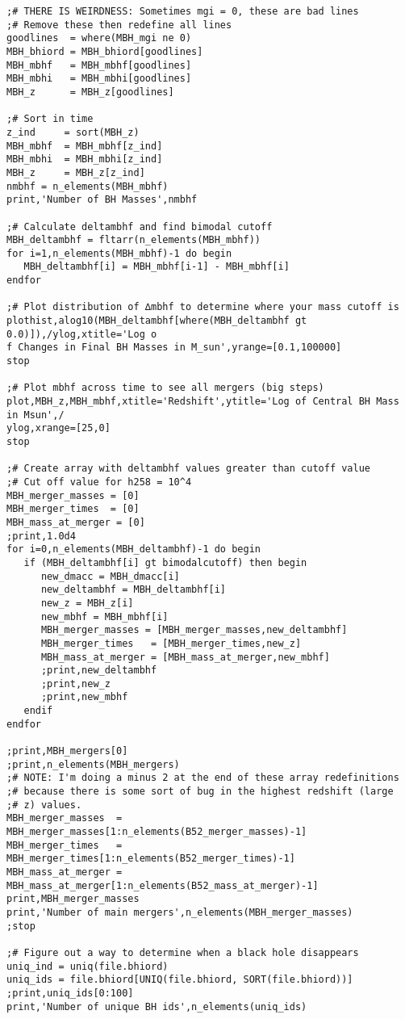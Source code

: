 \documentclass[12pt,headA,chapB]{fiskthesis}
\begin{document}
\begin{verbatim}
;# THERE IS WEIRDNESS: Sometimes mgi = 0, these are bad lines
;# Remove these then redefine all lines
goodlines  = where(MBH_mgi ne 0)
MBH_bhiord = MBH_bhiord[goodlines]
MBH_mbhf   = MBH_mbhf[goodlines]
MBH_mbhi   = MBH_mbhi[goodlines]
MBH_z      = MBH_z[goodlines]

;# Sort in time
z_ind     = sort(MBH_z)
MBH_mbhf  = MBH_mbhf[z_ind]
MBH_mbhi  = MBH_mbhi[z_ind]
MBH_z     = MBH_z[z_ind]
nmbhf = n_elements(MBH_mbhf)
print,'Number of BH Masses',nmbhf

;# Calculate deltambhf and find bimodal cutoff
MBH_deltambhf = fltarr(n_elements(MBH_mbhf))
for i=1,n_elements(MBH_mbhf)-1 do begin
   MBH_deltambhf[i] = MBH_mbhf[i-1] - MBH_mbhf[i]
endfor

;# Plot distribution of ∆mbhf to determine where your mass cutoff is
plothist,alog10(MBH_deltambhf[where(MBH_deltambhf gt 0.0)]),/ylog,xtitle='Log o
f Changes in Final BH Masses in M_sun',yrange=[0.1,100000]
stop

;# Plot mbhf across time to see all mergers (big steps)
plot,MBH_z,MBH_mbhf,xtitle='Redshift',ytitle='Log of Central BH Mass in Msun',/
ylog,xrange=[25,0]
stop

;# Create array with deltambhf values greater than cutoff value
;# Cut off value for h258 = 10^4
MBH_merger_masses = [0]
MBH_merger_times  = [0]
MBH_mass_at_merger = [0]
;print,1.0d4
for i=0,n_elements(MBH_deltambhf)-1 do begin
   if (MBH_deltambhf[i] gt bimodalcutoff) then begin
      new_dmacc = MBH_dmacc[i]
      new_deltambhf = MBH_deltambhf[i]
      new_z = MBH_z[i]
      new_mbhf = MBH_mbhf[i]
      MBH_merger_masses = [MBH_merger_masses,new_deltambhf] 
      MBH_merger_times   = [MBH_merger_times,new_z]
      MBH_mass_at_merger = [MBH_mass_at_merger,new_mbhf]
      ;print,new_deltambhf
      ;print,new_z
      ;print,new_mbhf
   endif
endfor

;print,MBH_mergers[0]
;print,n_elements(MBH_mergers)
;# NOTE: I'm doing a minus 2 at the end of these array redefinitions
;# because there is some sort of bug in the highest redshift (large
;# z) values.
MBH_merger_masses  = MBH_merger_masses[1:n_elements(B52_merger_masses)-1]
MBH_merger_times   = MBH_merger_times[1:n_elements(B52_merger_times)-1]
MBH_mass_at_merger = MBH_mass_at_merger[1:n_elements(B52_mass_at_merger)-1]
print,MBH_merger_masses
print,'Number of main mergers',n_elements(MBH_merger_masses)
;stop

;# Figure out a way to determine when a black hole disappears
uniq_ind = uniq(file.bhiord)
uniq_ids = file.bhiord[UNIQ(file.bhiord, SORT(file.bhiord))]
;print,uniq_ids[0:100]
print,'Number of unique BH ids',n_elements(uniq_ids)


\end{verbatim}
\end{document}
